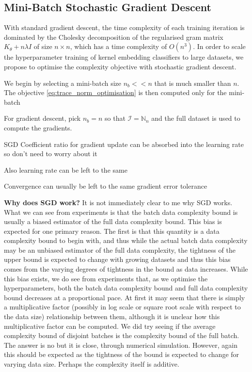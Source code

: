 \documentclass{article}
\begin{document}
	\subsection{Mini-Batch Stochastic Gradient Descent}
	\label{sec:stochastic_gradient_descent}

		With standard gradient descent, the time complexity of each training iteration is dominated by the Cholesky decomposition of the regularised gram matrix $K_{\theta} + n \lambda I$ of size $n \times n$, which has a time complexity of $O(n^{3})$. In order to scale the hyperparameter training of kernel embedding classifiers to large datasets, we propose to optimise the complexity objective with stochastic gradient descent.
		
		We begin by selecting a mini-batch size $n_{b} << n$ that is much smaller than $n$. The objective \eqref{eq:trace_norm_optimisation} is then computed only for the mini-batch 
	
		
		For gradient descent, pick $n_{b} = n$ so that $\mathcal{I} = \mathbb{N}_{n}$ and the full dataset is used to compute the gradients.
		
		SGD Coefficient ratio for gradient update can be absorbed into the learning rate so don't need to worry about it
		
		Also learning rate can be left to the same
		
		Convergence can usually be left to the same gradient error tolerance
		
		\textbf{Why does SGD work?} It is not immediately clear to me why SGD works. What we can see from experiments is that the batch data complexity bound is usually a biased estimator of the full data complexity bound. This bias is expected for one primary reason. The first is that this quantity is a data complexity bound to begin with, and thus while the actual batch data complexity may be an unbiased estimator of the full data complexity, the tightness of the upper bound is expected to change with growing datasets and thus this bias comes from the varying degrees of tightness in the bound as data increases. While this bias exists, we do see from experiments that, as we optimise the hyperparameters, both the batch data complexity bound and full data complexity bound decreases at a proportional pace. At first it may seem that there is simply a multiplicative factor (possibly in log scale or square root scale with respect to the data size) relationship between them, although it is unclear how this multiplicative factor can be computed. We did try seeing if the average complexity bound of disjoint batches is the complexity bound of the full batch. The answer is no but it is close, through numerical simulation. However, again this should be expected as the tightness of the bound is expected to change for varying data size. Perhaps the complexity itself is additive.
		
\end{document}
